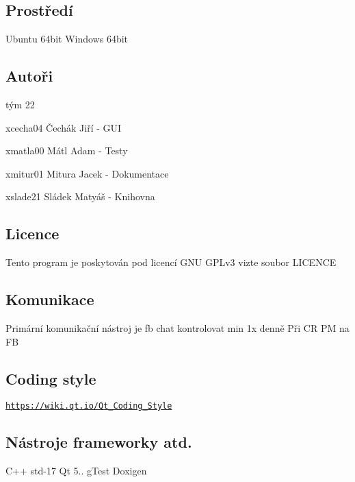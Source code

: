 \subsection*{Prostředí }

Ubuntu 64bit Windows 64bit

\subsection*{Autoři }

tým 22
\begin{DoxyItemize}
\item xcecha04 Čechák Jiří  -\/ G\+UI
\item xmatla00 Mátl Adam  -\/ Testy
\item xmitur01 Mitura Jacek  -\/ Dokumentace
\item xslade21 Sládek Matyáš  -\/ Knihovna
\end{DoxyItemize}

\subsection*{Licence }

Tento program je poskytován pod licencí G\+NU G\+P\+Lv3 vizte soubor L\+I\+C\+E\+N\+CE

\subsection*{Komunikace }

Primární komunikační nástroj je fb chat kontrolovat min 1x denně Při CR PM na FB

\subsection*{Coding style }

\href{https://wiki.qt.io/Qt_Coding_Style}{\tt https\+://wiki.\+qt.\+io/\+Qt\+\_\+\+Coding\+\_\+\+Style}

\subsection*{Nástroje frameworky atd. }

C++ std-\/17 Qt 5.. g\+Test Doxigen 